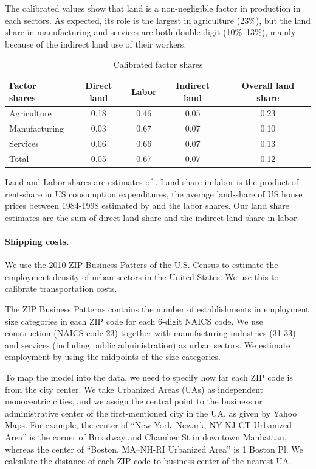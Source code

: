 \documentclass[12pt]{article}
\begin{document}
The calibrated values show that land is a non-negligible factor in production in each sectors. As expected, its role is the largest in agriculture (23\%), but the land share in manufacturing and services are both double-digit (10\%--13\%), mainly because of the indirect land use of their workers.


\begin{table}[h!]
\caption{Calibrated factor shares\label{tab:Sector_Shares}}
\begin{center}
\begin{tabular}{l|ccc|c}
\toprule
Factor shares & Direct land & Labor & Indirect land & Overall land share \\
\midrule
Agriculture & 0.18 & 0.46  & 0.05 & 0.23 \\
Manufacturing& 0.03 & 0.67 & 0.07 & 0.10  \\
Services    &  0.06 & 0.66 & 0.07 & 0.13 \\
\midrule
Total & 0.05 & 0.67  & 0.07 & 0.12 \\
\bottomrule
\end{tabular}
\end{center}

\noindent \footnotesize{Land and Labor shares are estimates of . Land share in labor is the product of rent-share in US consumption expenditures, the average land-share of US house prices between 1984-1998 estimated by  and the labor shares. Our land share estimates are the sum of direct land share and the indirect land share in labor.}
\end{table}

\paragraph{Shipping costs.}
We use the 2010 ZIP Business Patters of the U.S. Census \cite{CBP} to estimate the employment density of urban sectors in the United States. We use this to calibrate transportation costs.

The ZIP Business Patterns contains the number of establishments in employment size categories in each ZIP code for each 6-digit NAICS code. We use construction (NAICS code 23) together with manufacturing industries (31-33) and services (including public administration) as urban sectors. We estimate employment by using the midpoints of the size categories.

To map the model into the data, we need to specify how far each ZIP code is from the city center. We take Urbanized Areas (UAs) as independent monocentric cities, and we assign the central point to the business or administrative center of the first-mentioned city in the UA, as given by Yahoo Maps. For example, the center of ``New York–Newark, NY-NJ-CT Urbanized Area'' is the corner of Broadway and Chamber St in downtown Manhattan, whereas the center of ``Boston, MA–NH-RI Urbanized Area'' is 1 Boston Pl. We calculate the distance of each ZIP code to business center of the nearest UA.
\end{document}
